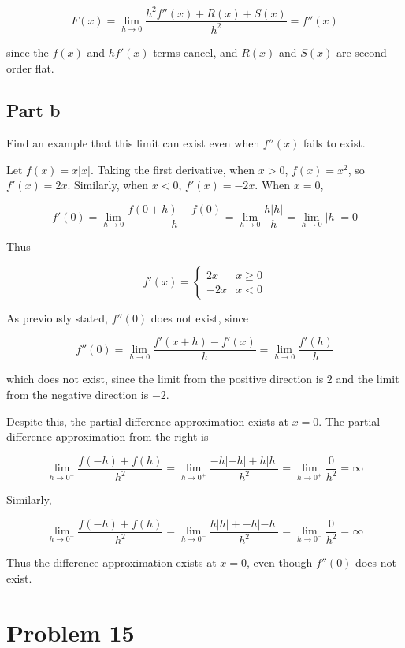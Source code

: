 \documentclass{article}
\begin{document}
\[
F(x) =
\lim_{h \rightarrow 0} \frac{h^2 f''(x) + R(x) + S(x)}{h^2}
= f''(x)
\]

since the $f(x)$ and $hf'(x)$ terms cancel, and $R(x)$ and $S(x)$ are second-order flat.

\subsection*{Part b}

Find an example that this limit can exist even when $f''(x)$ fails to exist.

Let $f(x) = x|x|$. Taking the first derivative, when $x>0$, $f(x) = x^2$, so $f'(x) = 2x$. Similarly, when $x<0$, $f'(x) = -2x$. When $x=0$,

\[
f'(0) = \lim_{h \rightarrow 0} \frac{f(0+h) - f(0)}{h} = \lim_{h \rightarrow 0} \frac{h|h|}{h} = \lim_{h \rightarrow 0} |h| = 0
\]

Thus

\[
f'(x) =
\begin{cases}
2x & x \geq 0 \\
-2x & x < 0
\end{cases}
\]

As previously stated, $f''(0)$ does not exist, since

\[
f''(0) = \lim_{h \rightarrow 0} \frac{f'(x+h) - f'(x)}{h} = \lim_{h \rightarrow 0} \frac{f'(h)}{h}
\]

which does not exist, since the limit from the positive direction is $2$ and the limit from the negative direction is $-2$.

Despite this, the partial difference approximation exists at $x = 0$. The partial difference approximation from the right is

\[
\lim_{h \rightarrow 0^+} \frac{f(-h) + f(h)}{h^2} = 
\lim_{h \rightarrow 0^+} \frac{-h|-h| + h|h|}{h^2} =
\lim_{h \rightarrow 0^+} \frac{0}{h^2} = \infty
\]

Similarly,

\[
\lim_{h \rightarrow 0^-} \frac{f(-h) + f(h)}{h^2} = 
\lim_{h \rightarrow 0^-} \frac{h|h| + -h|-h|}{h^2} =
\lim_{h \rightarrow 0^-} \frac{0}{h^2} = \infty
\]

Thus the difference approximation exists at $x=0$, even though $f''(0)$ does not exist.

\section*{Problem 15}
\end{document}
